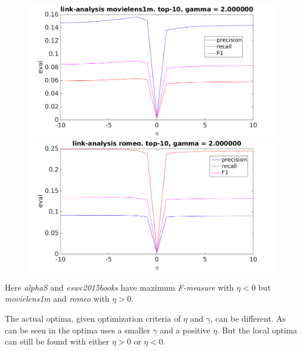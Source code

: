 \begin{figure}[h!]
\centering
\begin{minipage}{.5\textwidth}
    \centering
    \includegraphics[width=\linewidth]{fig/link_eta/movielens_link_eta.png}
\end{minipage}%
\begin{minipage}{.5\textwidth}
    \centering
    \includegraphics[width=\linewidth]{fig/link_eta/romeo_link_eta.png}
\end{minipage}
\end{figure}

\FloatBarrier

Here \textit{alphaS} and \textit{eswc2015books} have maximum \textit{F-measure} with $\eta < 0$ but \textit{movielens1m} and \textit{romeo} with $\eta > 0$.

The actual optima, given optimization criteria of $\eta$ and $\gamma$, can be different. As can be seen in  the optima uses a smaller $\gamma$ and a positive $\eta$. But the local optima can still be found with either $\eta > 0$ or $\eta < 0$.

